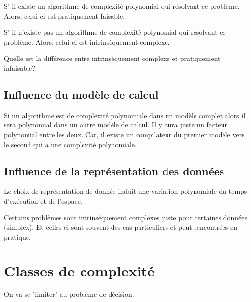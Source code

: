 \begin{mydef}
	S’ il existe un algorithme de complexité polynomial qui résolvant ce 
	problème. Alors, celui-ci est pratiquement faisable.
\end{mydef}

\begin{mydef}
	S’ il n'existe pas un algorithme de complexité polynomial qui résolvant ce 
	problème. Alors, celui-ci est intrinsèquement complexe.
\end{mydef}

\begin{myrem}
	Quelle est la différence entre intrinsèquement complexe et pratiquement 
	infaisable?
\end{myrem}

\subsection{Influence du modèle de calcul}
\label{sub:influence_du_mod_le_de_calcul}
Si un algorithme est de complexité polynomiale dans un modèle complet alors il sera 
polynomial dans un autre modèle de calcul. Il y aura juste un facteur 
polynomial entre les deux. Car, il existe un compilateur du premier modèle vers 
le second qui a une complexité polynomiale.

\subsection{Influence de la représentation des données}
\label{sub:influence_de_la_repr_sentation_des_donn_es}
Le choix de représentation de donnée induit une variation polynomiale du temps 
d'exécution et de l'espace.

\begin{myrem}
	Certains problèmes sont intrinsèquement complexes juste pour certaines 
	données (simplex). Et celles-ci sont souvent des cas particuliers et peut 
	rencontrées en pratique.
\end{myrem}


\section{Classes de complexité}
\label{sec:classes_de_complexit_}
On va se "limiter" au problème de décision.

